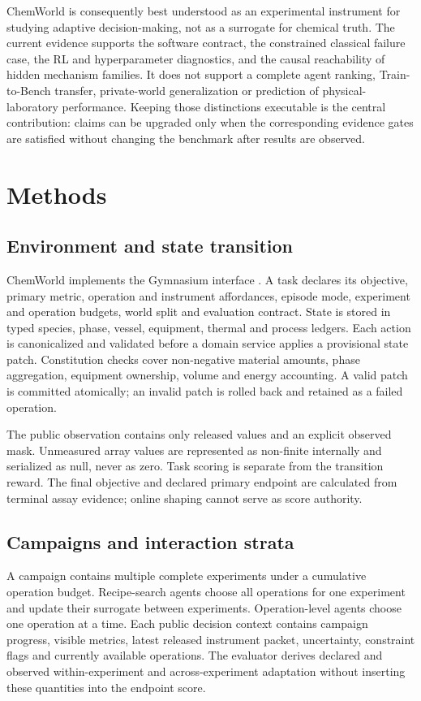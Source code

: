 \documentclass[11pt]{article}
\begin{document}
ChemWorld is consequently best understood as an experimental instrument for studying adaptive decision-making, not as a surrogate for chemical truth. The current evidence supports the software contract, the constrained classical failure case, the RL and hyperparameter diagnostics, and the causal reachability of hidden mechanism families. It does not support a complete agent ranking, Train-to-Bench transfer, private-world generalization or prediction of physical-laboratory performance. Keeping those distinctions executable is the central contribution: claims can be upgraded only when the corresponding evidence gates are satisfied without changing the benchmark after results are observed.

\section*{Methods}

\subsection*{Environment and state transition}

ChemWorld implements the Gymnasium interface \citep{towers2024gymnasium}. A task declares its objective, primary metric, operation and instrument affordances, episode mode, experiment and operation budgets, world split and evaluation contract. State is stored in typed species, phase, vessel, equipment, thermal and process ledgers. Each action is canonicalized and validated before a domain service applies a provisional state patch. Constitution checks cover non-negative material amounts, phase aggregation, equipment ownership, volume and energy accounting. A valid patch is committed atomically; an invalid patch is rolled back and retained as a failed operation.

The public observation contains only released values and an explicit observed mask. Unmeasured array values are represented as non-finite internally and serialized as null, never as zero. Task scoring is separate from the transition reward. The final objective and declared primary endpoint are calculated from terminal assay evidence; online shaping cannot serve as score authority.

\subsection*{Campaigns and interaction strata}

A campaign contains multiple complete experiments under a cumulative operation budget. Recipe-search agents choose all operations for one experiment and update their surrogate between experiments. Operation-level agents choose one operation at a time. Each public decision context contains campaign progress, visible metrics, latest released instrument packet, uncertainty, constraint flags and currently available operations. The evaluator derives declared and observed within-experiment and across-experiment adaptation without inserting these quantities into the endpoint score.
\end{document}
